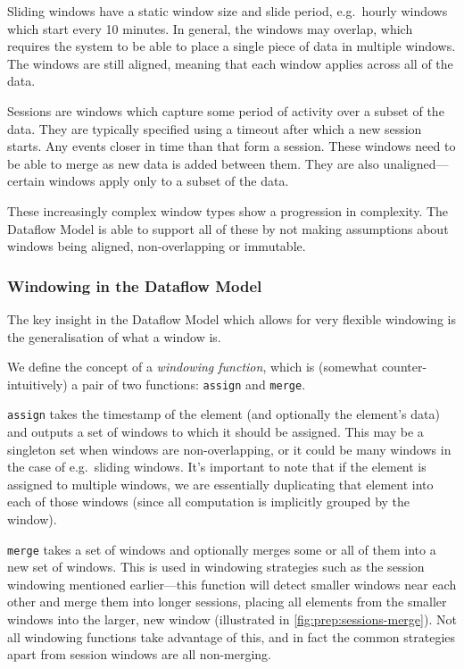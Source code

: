 Sliding windows have a static window size and slide period, e.g.\ hourly windows which start every 10 minutes.
In general, the windows may overlap, which requires the system to be able to place a single piece of data in multiple windows.
The windows are still aligned, meaning that each window applies across all of the data.

Sessions are windows which capture some period of activity over a subset of the data.
They are typically specified using a timeout after which a new session starts.
Any events closer in time than that form a session.
These windows need to be able to merge as new data is added between them.
They are also unaligned---certain windows apply only to a subset of the data.

These increasingly complex window types show a progression in complexity.
The Dataflow Model is able to support all of these by not making assumptions about windows being aligned, non-overlapping or immutable.

\subsubsection{Windowing in the Dataflow Model}
The key insight in the Dataflow Model which allows for very flexible windowing is the generalisation of what a window is.

We define the concept of a \emph{windowing function}, which is (somewhat counter-intuitively) a pair of two functions: \texttt{assign} and \texttt{merge}.

\texttt{assign} takes the timestamp of the element (and optionally the element's data) and outputs a set of windows to which it should be assigned.
This may be a singleton set when windows are non-overlapping, or it could be many windows in the case of e.g.\ sliding windows.
It's important to note that if the element is assigned to multiple windows, we are essentially duplicating that element into each of those windows (since all computation is implicitly grouped by the window).

\texttt{merge} takes a set of windows and optionally merges some or all of them into a new set of windows.
This is used in windowing strategies such as the session windowing mentioned earlier---this function will detect smaller windows near each other and merge them into longer sessions, placing all elements from the smaller windows into the larger, new window (illustrated in \cref{fig:prep:sessions-merge}).
Not all windowing functions take advantage of this, and in fact the common strategies apart from session windows are all non-merging.

